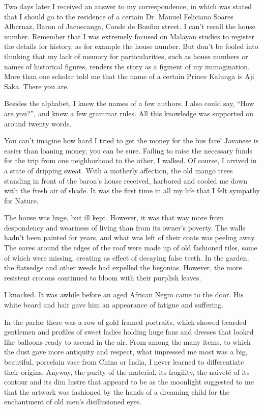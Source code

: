 \documentclass[a4paper,12pt]{book}
\begin{document}
Two days later I received an answer to my correspondence,
in which was stated
that I should go to the residence of
a certain Dr. Manuel Feliciano Soares Albernaz,
Baron of Jacuecanga,
Conde de Bonfim street.
I can't recall the house
number. Remember that  I was extremely focused
on Malayan studies to register the details
for history, as for example the house number.
But don't be fooled into thinking that
my lack of memory for particularities,
such as house numbers or names of historical
figures, renders the story as a figment
of my immagination. More than one scholar
told me that the  name of a certain
Prince Kalunga is Aji Saka. There you are.

Besides the alphabet, I knew the names
of a few authors. I also could say, ``How are
you?'', and knew a few grammar rules.
All this knowledge was supported
on around twenty words.

You can't imagine how hard I tried
to get the money for the bus fare! Javanese
is easier than loaning money,
you can be sure. Failing to raise
the necessary funds for the trip from
one neighborhood to the other, I walked.
Of course, I arrived in a state of dripping sweat.
With a motherly
affection, the old
mango trees standing in front
of the baron's house received, harbored
and cooled me down with the fresh air of shade.
It was the first time in all my life
that I felt sympathy for Nature.

The house was huge, but ill kept.
However, it was that way more from
despondency and weariness of living
than from its owner's poverty.
The walls hadn't been
painted for years, and what was left
of their coats was peeling away.
The eaves around the edges of the
roof were made up of old fashioned tiles,
some of which were missing, creating
as effect of decaying false teeth.
In the garden, the
flatsedge and other weeds had expelled the 
begonias. However, the more resistent crotons
continued to bloom with their purplish leaves.

I knocked. It was awhile before 
an aged African Negro came to the door. His white
beard and hair gave him an appearance of
fatigue and suffering.

In the parlor there was a row of gold framed portraits,
which showed bearded gentlemen and profiles of
sweet ladies holding huge fans and dresses
that looked like balloons ready to ascend in the air.
From among the many items,
to which the dust gave more antiquity and respect,
what impressed me most was a big, beautiful,
porcelain vase from China or India, I never
learned to differentiate their origins.
Anyway, the purity of the material,
its fragility, the naiveté of its contour
and its dim lustre that appeard to be
as the moonlight suggested to me that
the artwork was fashioned by the hands
of a dreaming child for
the enchantment of old men's  disillusioned eyes.
\end{document}
